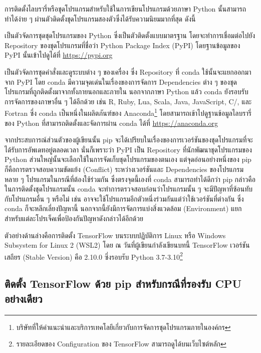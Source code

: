การติดตั้งไลบรารี่หรือชุดโปรแกรมสำหรับใช้ในการเขียนโปรแกรมด้วยภาษา Python นั้นสามารถทำได้ง่าย ๆ ผ่านตัวติดตั้งชุดโปรแกรมสองตัวซึ่งได้รับความนิยมมากที่สุด ดังนี้
%
\begin{description}[topsep=0pt,noitemsep]\setlength\itemsep{0.5em}
    \item[pip] เป็นตัวจัดการชุดชุดโปรแกรมของ Python ซึ่งเป็นตัวติดตั้งแบบมาตรฐาน โดยจะทำการเชื่อมต่อไปยัง Repository ของชุดโปรแกรมที่ชื่อว่า Python Package Index (PyPI) โดยฐานข้อมูลของ PyPI นั้นเข้าไปดูได้ที่ \url{https://pypi.org}
    
    \item[conda] เป็นตัวจัดการชุดคำสั่งและดูระบบต่าง ๆ ของเครื่อง ซึ่ง Repository ที่ conda ใช้นั้นจะแยกออกมาจาก PyPI โดย conda มีความจุดเด่นในเรื่องของการจัดการ Dependencies ต่าง ๆ ของชุดโปรแกรมที่ถูกติดตั้งมาจากทั้งภายนอกและภายใน นอกจากภาษา Python แล้ว conda ยังรอบรับการจัดการของภาษาอื่น ๆ ได้อีกด้วย เช่น R, Ruby, Lua, Scala, Java, JavaScript, C/\cpp, และ Fortran ซึ่ง conda เป็นหนึ่งในผลิตภันฑ์ของ Anaconda\footnote{บริษัทที่ให้คำแนะนำและบริการเทคโลยีเกี่ยวกับการจัดการชุดโปรแกรมภายในองค์กร} โดยสามารถเข้าไปดูฐานข้อมูลไลบรารี่ของ Python ที่สามารถติดตั้งและจัดการผ่าน conda ได้ที่ \url{https://anaconda.org}
\end{description}

จากประสบการณ์ส่วนตัวของผู้เขียนนั้น pip จะได้เปรียบในเรื่องของการเวอร์ชันของชุดโปรแกรมที่จะได้รับการอัพเดทอยู่ตลอดเวลา นั่นก็เพราะว่า PyPI เป็น Repository ที่นักพัฒนาชุดโปรแกรมของ Python ส่วนใหญ่นั้นจะเลือกใช้ในการจัดเก็บชุดโปรแกรมของตนเอง แต่จุดอ่อนอย่างหนึ่งของ pip ก็คือการตรวจสอบความขัดแย้ง (Conflict) ระหว่างเวอร์ชันและ Dependencies ของโปรแกรมหลาย ๆ โปรแกรมในกรณีที่ต้องใช้ร่วมกัน ซึ่งตรงจุดนี้เองที่ conda สามารถทำได้ดีกว่า pip กล่าวคือ ในการติดตั้งชุดโปรแกรมนั้น conda จะทำการตรวจสอบก่อนว่าโปรแกรมนั้น ๆ จะมีปัญหาที่ซ้อนทับกับโปรแกรมอื่น ๆ หรือไม่ เช่น อาจจะใช้โปรแกรมอีกตัวหนึ่งร่วมกันแต่ว่าใช้เวอร์ชันที่ต่างกัน ซึ่ง conda ก็จะหลีกเลี่ยงปัญหานี้ นอกจากนี้ยังมีการจัดการแบ่งสิ่งแวดล้อม (Environment) แยกสำหรับแต่ละโปรเจ็คเพื่อป้องกันปัญหาดังกล่าวได้อีกด้วย

ตัวอย่างด้านล่างคือการติดตั้ง TensorFlow บนระบบปฏิบัติการ Linux หรือ Windows Subsystem for Linux 2 (WSL2) โดย ณ วันที่ผู้เขียนกำลังเขียนบทนี้ TensorFlow เวอร์ชันเสถียร (Stable Version) คือ 2.10.0 ซึ่งรอบรับ Python 3.7-3.10\footnote{รายละเอียดของ Configuration ของ TensorFlow สามารถดูได้บนเว็บไซต์หลัก}

\subsection{ติดตั้ง TensorFlow ด้วย pip สำหรับกรณีที่รองรับ CPU อย่างเดียว}

